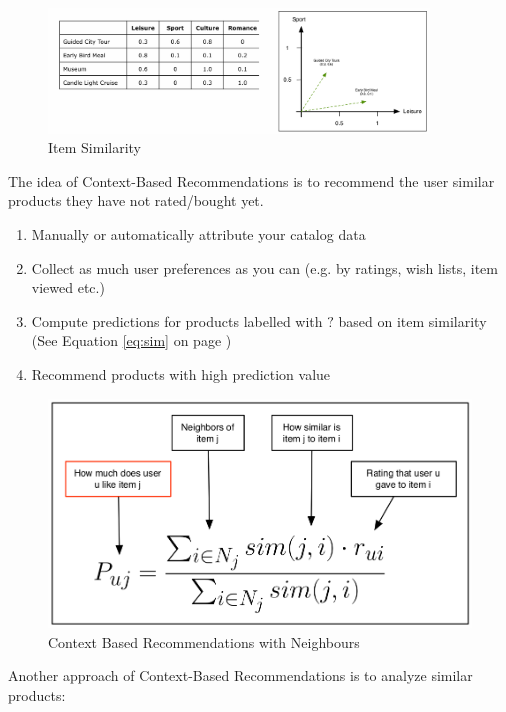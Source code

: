 \documentclass[11pt]{article}
\begin{document}
\begin{figure}[htb!]
    \centering
    \includegraphics[keepaspectratio=true, width=0.9\textwidth]{item_similarity.png}
    \caption{Item Similarity}
    \label{fig:item_similarity}
\end{figure}

The idea of Context-Based Recommendations is to recommend the user similar products they have not rated/bought yet.

\begin{enumerate}
    \item Manually or automatically attribute your catalog data
    \item Collect as much user preferences as you can (e.g. by ratings, wish lists, item viewed etc.)
    \item Compute predictions for products labelled with $?$ based on item similarity (See Equation \ref{eq:sim} on page \pageref{eq:sim})
    \item Recommend products with high prediction value
\end{enumerate}

\begin{figure}
    \centering
    \includegraphics[keepaspectratio=true,height=10\baselineskip]{context_based_recommendations_v2.png}
    \caption{Context Based Recommendations with Neighbours}
    \label{fig:context_based_recommendations_2}
\end{figure}
Another approach of Context-Based Recommendations is to analyze similar products:
\end{document}
